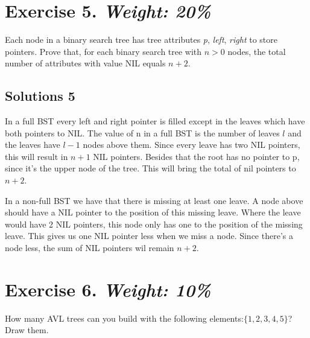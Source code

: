\documentclass{article}
\begin{document}

\newpage
\section*{Exercise 5. \textit{Weight: 20\%}}
Each node in a binary search tree has tree attributes \emph{p}, \emph{left}, \emph{right} to store pointers.
Prove that, for each binary search tree with $n>0$ nodes, the total number of attributes with value NIL equals $n+2$.

\subsection*{Solutions 5}
In a full BST every left and right pointer is filled except in the leaves which have both pointers to NIL. The value of n in a full BST is the number of leaves $l$ and the leaves have $l - 1$ nodes above them. Since every leave has two NIL pointers, this will result in $n + 1$ NIL pointers. Besides that the root has no pointer to p, since it's the upper node of the tree. This will bring the total of nil pointers to $n + 2$.

In a non-full BST we have that there is missing at least one leave. A node above should have a NIL pointer to the position of this missing leave. Where the leave would have 2 NIL pointers, this node only has one to the position of the missing leave. This gives us one NIL pointer less when we miss a node. Since there's a node less, the sum of NIL pointers wil remain $n + 2$.

\newpage
\section*{Exercise 6. \textit{Weight: 10\%}}
How many AVL trees can you build with the following elements:$\{1, 2, 3, 4, 5\}$? Draw them.
\end{document}
